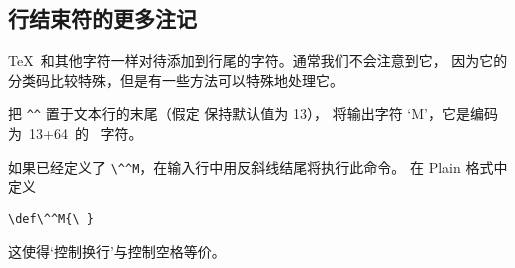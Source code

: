 \documentclass{book}
\begin{document}
\subsection{行结束符的更多注记}

\TeX\ 和其他字符一样对待添加到行尾的字符。通常我们不会注意到它，
因为它的分类码比较特殊，但是有一些方法可以特殊地处理它。

\begin{example}
把 \verb>^^> 置于文本行的末尾（假定  保持默认值为 13），
将输出字符 `M'，它是编码为~13+64~的 \ascii\ 字符。
\end{example}

\begin{example} 如果已经定义了 \verb>\^^M>，在输入行中用反斜线结尾将执行此命令。
在 Plain 格式中定义
\begin{verbatim}
\def\^^M{\ }
\end{verbatim}
这使得`控制换行'与控制空格等价。
\end{example}

\end{document}
